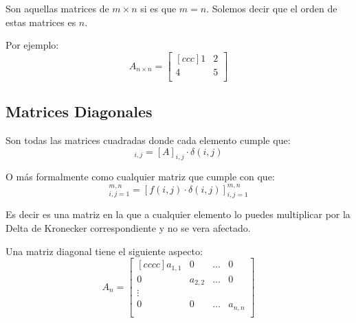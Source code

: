 \documentclass[12pt, fleqn]{report}                             %
\begin{document}
                Son aquellas matrices de $m \times n$ si es que $m = n$.
                Solemos decir que el orden de estas matrices es $n$.

                Por ejemplo: 
                \begin{equation*}
                    A_{n \times n} =
                    \begin{bmatrix}[ccc]
                        1 & 2 \\
                        4 & 5 \\
                    \end{bmatrix}
                \end{equation*}

            \subsection{Matrices Diagonales}

                Son todas las matrices cuadradas donde cada elemento cumple que:
                \begin{equation}
                    [A]_{i,j} = [A]_{i,j} \cdot \delta(i,j)
                \end{equation}

                O más formalmente como cualquier matriz que cumple con que:
                \begin{equation}
                    [f(i,j)]_{i, j = 1}^{m, n} = [ f(i,j) \cdot \delta(i,j) ]_{i, j = 1}^{m, n}  
                \end{equation}

                Es decir es una matriz en la que a cualquier elemento lo puedes multiplicar 
                por la Delta de Kronecker correspondiente y no se vera afectado.

                Una matriz diagonal tiene el siguiente aspecto:
                \begin{equation*}
                    A_n =
                    \begin{bmatrix}[cccc]
                        a_{1,1} & 0         & \dots & 0         \\
                        0       & a_{2,2}   & \dots & 0         \\
                        \vdots                                  \\
                        0       & 0         & \dots & a_{n,n}   \\
                    \end{bmatrix}
                \end{equation*}
\end{document}
